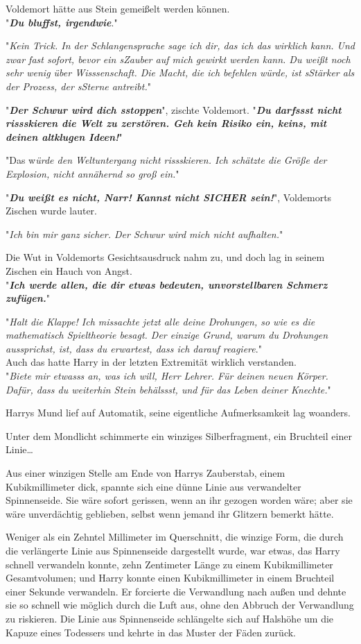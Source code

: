 {Voldemort hätte aus Stein gemeißelt werden können.\\ "\textbf{\emph{Du bluffst, irgendwie}}."

"\emph{Kein Trick. In der Schlangensprache sage ich dir, das ich das wirklich kann. Und zwar fast sofort, bevor ein sZauber auf mich gewirkt werden kann. Du weißt noch sehr wenig über Wisssenschaft. Die Macht, die ich befehlen würde, ist sStärker als der Prozess, der sSterne antreibt.}"

"\textbf{\emph{Der Schwur wird dich sstoppen}}", zischte Voldemort. "\textbf{\emph{Du darfssst nicht rissskieren die Welt zu zerstören. Geh kein Risiko ein, keins, mit deinen altklugen Ideen!}}"

"Das w\emph{ürde den Weltuntergang nicht rissskieren. Ich schätzte die Größe der Explosion, nicht annähernd so groß ein.}"

"\textbf{\emph{Du weißt es nicht, Narr! Kannst nicht SICHER sein!}}", Voldemorts Zischen wurde lauter.

"\emph{Ich bin mir ganz sicher. Der Schwur wird mich nicht aufhalten.}"

Die Wut in Voldemorts Gesichtsausdruck nahm zu, und doch lag in seinem Zischen ein Hauch von Angst.\\ "\textbf{\emph{Ich werde allen, die dir etwas bedeuten, unvorstellbaren Schmerz zufügen.}}"

"\emph{Halt die Klappe! Ich missachte jetzt alle deine Drohungen, so wie es die mathematisch Spieltheorie besagt. Der einzige Grund, warum du Drohungen aussprichst, ist, dass du erwartest, dass ich darauf reagiere}."\\ Auch das hatte Harry in der letzten Extremität wirklich verstanden.\\ "\emph{Biete mir etwasss an, was ich will, Herr Lehrer. Für deinen neuen Körper. Dafür, dass du weiterhin Stein behälssst, und für das Leben deiner Knechte.}"

Harrys Mund lief auf Automatik, seine eigentliche Aufmerksamkeit lag woanders.

Unter dem Mondlicht schimmerte ein winziges Silberfragment, ein Bruchteil einer Linie…

Aus einer winzigen Stelle am Ende von Harrys Zauberstab, einem Kubikmillimeter dick, spannte sich eine dünne Linie aus verwandelter Spinnenseide. Sie wäre sofort gerissen, wenn an ihr gezogen worden wäre; aber sie wäre unverdächtig geblieben, selbst wenn jemand ihr Glitzern bemerkt hätte.

Weniger als ein Zehntel Millimeter im Querschnitt, die winzige Form, die durch die verlängerte Linie aus Spinnenseide dargestellt wurde, war etwas, das Harry schnell verwandeln konnte, zehn Zentimeter Länge zu einem Kubikmillimeter Gesamtvolumen; und Harry konnte einen Kubikmillimeter in einem Bruchteil einer Sekunde verwandeln. Er forcierte die Verwandlung nach außen und dehnte sie so schnell wie möglich durch die Luft aus, ohne den Abbruch der Verwandlung zu riskieren. Die Linie aus Spinnenseide schlängelte sich auf Halshöhe um die Kapuze eines Todessers und kehrte in das Muster der Fäden zurück.

}
